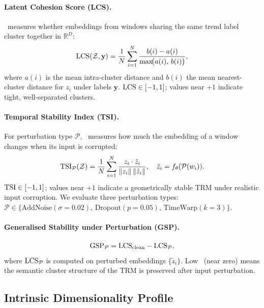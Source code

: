 \paragraph{Latent Cohesion Score (LCS).}
\lcs\ measures whether embeddings from windows sharing the same trend label
cluster together in $\mathbb{R}^D$:
\begin{equation}
  \mathrm{LCS}(\mathcal{Z}, \mathbf{y}) = \frac{1}{N} \sum_{i=1}^{N}
  \frac{b(i) - a(i)}{\max\!\bigl(a(i),\, b(i)\bigr)},
  \label{eq:lcs}
\end{equation}
where $a(i)$ is the mean intra-cluster distance and $b(i)$ the mean
nearest-cluster distance for $z_i$ under labels $\mathbf{y}$.
$\mathrm{LCS} \in [-1,1]$; values near $+1$ indicate tight, well-separated clusters.

\paragraph{Temporal Stability Index (TSI).}
For perturbation type $\mathcal{P}$, \tsi\ measures how much the embedding
of a window changes when its input is corrupted:
\begin{equation}
  \mathrm{TSI}_{\mathcal{P}}(\mathcal{Z}) = \frac{1}{N} \sum_{i=1}^{N}
  \frac{z_i \cdot \tilde{z}_i}{\|z_i\|\,\|\tilde{z}_i\|},
  \quad \tilde{z}_i = f_\theta(\mathcal{P}(w_i)).
  \label{eq:tsi}
\end{equation}
$\mathrm{TSI} \in [-1,1]$; values near $+1$ indicate a geometrically stable TRM under
realistic input corruption.
We evaluate three perturbation types:
$\mathcal{P} \in \{\mathrm{AddNoise}(\sigma{=}0.02),\,
\mathrm{Dropout}(p{=}0.05),\, \mathrm{TimeWarp}(k{=}3)\}$.

\paragraph{Generalised Stability under Perturbation (GSP).}
\begin{equation}
  \mathrm{GSP}_{\mathcal{P}} = \mathrm{LCS}_{\mathrm{clean}} - \mathrm{LCS}_{\mathcal{P}},
  \label{eq:gsp}
\end{equation}
where $\mathrm{LCS}_{\mathcal{P}}$ is computed on perturbed embeddings
$\{\tilde{z}_i\}$.
Low \gsp\ (near zero) means the semantic cluster structure of the TRM is
preserved after input perturbation.

\subsection{Intrinsic Dimensionality Profile}
\label{sec:id_method}


